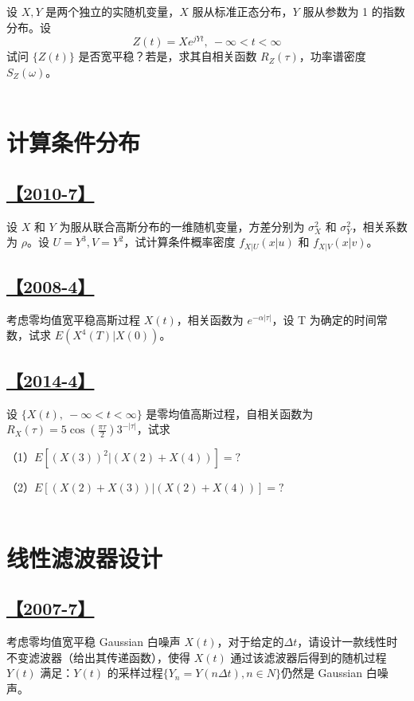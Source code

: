 设 $X, Y$ 是两个独立的实随机变量，$X$ 服从标准正态分布，$Y$ 服从参数为 1 的指数分布。设
$$
Z(t)=Xe^{jYt}, \ -\infty<t<\infty
$$
试问 $\{Z(t)\}$ 是否宽平稳？若是，求其自相关函数 $R_Z(\tau)$，功率谱密度 $S_Z(\omega)$。
\\\\
\section{计算条件分布}

\subsection{\hyperref[A2010-7]{【2010-7】}}\label{Q2010-7}

设 $X$ 和 $Y$ 为服从联合高斯分布的一维随机变量，方差分别为 $\sigma_X^2$ 和 $\sigma_Y^2$，相关系数为 $\rho$。设 $U=Y^3, V=Y^2$，试计算条件概率密度 $f_{X|U}(x|u)$ 和 $f_{X|V}(x|v)$。

\subsection{\hyperref[A2008-4]{【2008-4】}}\label{Q2008-4}

考虑零均值宽平稳高斯过程 $X(t)$，相关函数为 $e^{-\alpha|\tau|}$，设 T 为确定的时间常数，试求 $E(X^4(T)|X(0))$。

\subsection{\hyperref[A2014-4]{【2014-4】}}\label{Q2014-4}

设 $\{X(t),\ -\infty<t<\infty\}$ 是零均值高斯过程，自相关函数为 $R_X(\tau)=5\cos(\frac{\pi\tau}{2})3^{-|\tau|}$，试求

（1）$E\left[(X(3))^2|(X(2)+X(4))\right]=?$

（2）$E\left[(X(2)+X(3))|(X(2)+X(4))\right]=?$
\\\\
\section{线性滤波器设计}

\subsection{\hyperref[A2007-7]{【2007-7】}}\label{Q2007-7}

考虑零均值宽平稳 Gaussian 白噪声 $X(t)$，对于给定的$\Delta t$，请设计一款线性时不变滤波器（给出其传递函数），使得 $X(t)$ 通过该滤波器后得到的随机过程 
 $Y(t)$ 满足：$Y(t)$ 的采样过程$\{Y_n=Y(n\Delta t),n\in N\}$仍然是 Gaussian 白噪声。 

